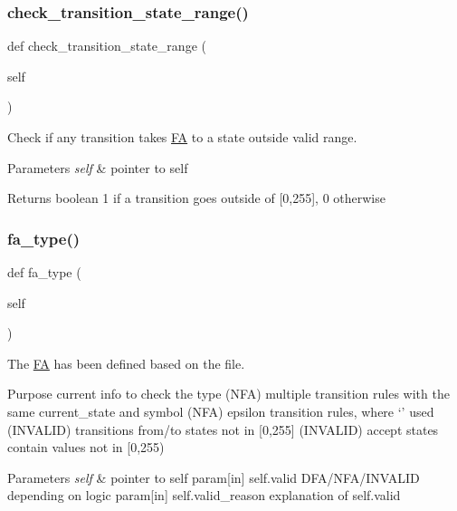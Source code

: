 \subsubsection{\texorpdfstring{check\+\_\+transition\+\_\+state\+\_\+range()}{check\_transition\_state\_range()}}
{\footnotesize\ttfamily def check\+\_\+transition\+\_\+state\+\_\+range (\begin{DoxyParamCaption}\item[{}]{self }\end{DoxyParamCaption})}



Check if any transition takes \mbox{\hyperlink{classfinite__automaton_1_1_f_a}{FA}} to a state outside valid range. 


\begin{DoxyParams}{Parameters}
{\em self} & pointer to self \\
\hline
\end{DoxyParams}
\begin{DoxyReturn}{Returns}
boolean 1 if a transition goes outside of \mbox{[}0,255\mbox{]}, 0 otherwise 
\end{DoxyReturn}
\mbox{\label{classfinite__automaton_1_1_f_a_a279deb94ddb3198fe1cc36a981f87550}} 
\subsubsection{\texorpdfstring{fa\+\_\+type()}{fa\_type()}}
{\footnotesize\ttfamily def fa\+\_\+type (\begin{DoxyParamCaption}\item[{}]{self }\end{DoxyParamCaption})}



The \mbox{\hyperlink{classfinite__automaton_1_1_f_a}{FA}} has been defined based on the file. 

Purpose current info to check the type (N\+FA) multiple transition rules with the same current\+\_\+state and symbol (N\+FA) epsilon transition rules, where \textquotesingle{}`' used (I\+N\+V\+A\+L\+ID) transitions from/to states not in \mbox{[}0,255\mbox{]} (I\+N\+V\+A\+L\+ID) accept states contain values not in \mbox{[}0,255) 
\begin{DoxyParams}{Parameters}
{\em self} & pointer to self param\mbox{[}in\mbox{]} self.\+valid D\+F\+A/\+N\+F\+A/\+I\+N\+V\+A\+L\+ID depending on logic param\mbox{[}in\mbox{]} self.\+valid\+\_\+reason explanation of self.\+valid \\
\hline
\end{DoxyParams}
\mbox{\label{classfinite__automaton_1_1_f_a_a34e4c3a2ff6279ae393c6aa71b6a6c67}} 
